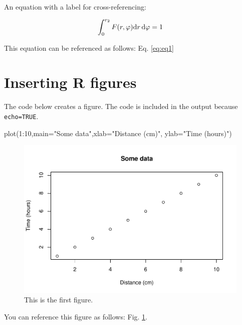 \documentclass[webpdf,large,contemporary,namedate]{oup-authoring-template}
\newenvironment{Shaded}{\begin{snugshade}}{\end{snugshade}}
\newcommand{\AttributeTok}[1]{\textcolor[rgb]{0.77,0.63,0.00}{#1}}
\newcommand{\DecValTok}[1]{\textcolor[rgb]{0.00,0.00,0.81}{#1}}
\newcommand{\FunctionTok}[1]{\textcolor[rgb]{0.00,0.00,0.00}{#1}}
\newcommand{\NormalTok}[1]{#1}
\newcommand{\SpecialCharTok}[1]{\textcolor[rgb]{0.00,0.00,0.00}{#1}}
\newcommand{\StringTok}[1]{\textcolor[rgb]{0.31,0.60,0.02}{#1}}
\theoremstyle{thmstyleone}
\theoremstyle{thmstyletwo}
\theoremstyle{thmstylethree}
\begin{document}
An equation with a label for cross-referencing:

\begin{equation}\label{eq:eq1}
\int^{r_2}_0 F(r,\varphi){\rm d}r\,{\rm d}\varphi = 1
\end{equation}

This equation can be referenced as follows: Eq. \ref{eq:eq1}

\hypertarget{inserting-r-figures}{%
\section{Inserting R figures}\label{inserting-r-figures}}

The code below creates a figure. The code is included in the output
because \texttt{echo=TRUE}.

\begin{Shaded}
\begin{Highlighting}[]
\FunctionTok{plot}\NormalTok{(}\DecValTok{1}\SpecialCharTok{:}\DecValTok{10}\NormalTok{,}\AttributeTok{main=}\StringTok{"Some data"}\NormalTok{,}\AttributeTok{xlab=}\StringTok{"Distance (cm)"}\NormalTok{,}
     \AttributeTok{ylab=}\StringTok{"Time (hours)"}\NormalTok{)}
\end{Highlighting}
\end{Shaded}

\begin{figure}[th]
\includegraphics[width=1\linewidth]{x_files/figure-latex/fig1-1} \caption{This is the first figure.}\label{fig:fig1}
\end{figure}

You can reference this figure as follows: Fig. \ref{fig:fig1}.
\end{document}
